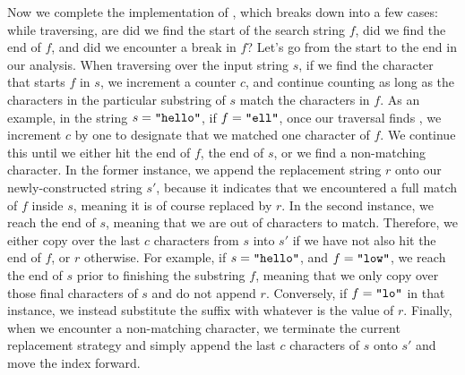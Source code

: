 Now we complete the implementation of , which breaks down into a few cases: while traversing, are did we find the start of the search string $f$, did we find the end of $f$, and did we encounter a break in $f$? Let's go from the start to the end in our analysis. When traversing over the input string $s$, if we find the character that starts $f$ in $s$, we increment a counter $c$, and continue counting as long as the characters in the particular substring of $s$ match the characters in $f$. As an example, in the string $s=\texttt{"hello"}$, if $f=\texttt{"ell"}$, once our traversal finds , we increment $c$ by one to designate that we matched one character of $f$. We continue this until we either hit the end of $f$, the end of $s$, or we find a non-matching character. In the former instance, we append the replacement string $r$ onto our newly-constructed string $s'$, because it indicates that we encountered a full match of $f$ inside $s$, meaning it is of course replaced by $r$. In the second instance, we reach the end of $s$, meaning that we are out of characters to match. Therefore, we either copy over the last $c$ characters from $s$ into $s'$ if we have not also hit the end of $f$, or $r$ otherwise. For example, if $s=\texttt{"hello"}$, and $f=\texttt{"low"}$, we reach the end of $s$ prior to finishing the substring $f$, meaning that we only copy over those final characters of $s$ and do not append $r$. Conversely, if $f=\texttt{"lo"}$ in that instance, we instead substitute the suffix  with whatever is the value of $r$. Finally, when we encounter a non-matching character, we terminate the current replacement strategy and simply append the last $c$ characters of $s$ onto $s'$ and move the index forward.

